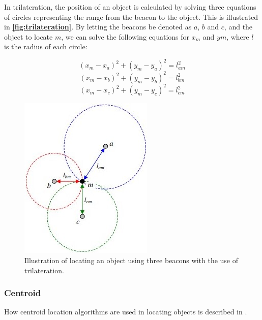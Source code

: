 In trilateration, the position of an object is calculated by solving three equations of circles representing the range from the beacon to the object. This is illustrated in \textbf{\autoref{fig:trilateration}}.
By letting the beacons be denoted as $a$, $b$ and $c$, and the object to locate $m$, we can solve the following equations for $x_m$ and $ym$, where $l$ is the radius of each circle:

\begin{equation} \label{eq:CirclesCalculation1}
    (x_m - x_a)^2 + (y_m - y_a)^2 = l_{am}^2
\end{equation}
\vspace{-3mm}
\begin{equation} \label{eq:CirclesCalculation2}
    (x_m - x_b)^2 + (y_m - y_b)^2 = l_{bm}^2
\end{equation}
\vspace{-3mm}
\begin{equation} \label{eq:CirclesCalculation3}
    (x_m - x_c)^2 + (y_m - y_c)^2 = l_{cm}^2
\end{equation}

\begin{figure}[H]
    \centering
    \includegraphics[scale=0.8]{Images/ProblemAnalysis/trilateration.jpg}
    \caption{Illustration of locating an object using three beacons with the use of trilateration\cite{Triangulation}.}
    \label{fig:trilateration}
\end{figure}

\subsubsection{Centroid}
How centroid location algorithms are used in locating objects is described in \cite{5759777}.

